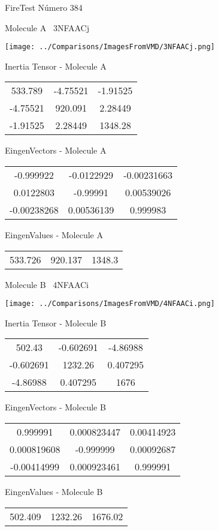\vtab[-3cm]
\begin{center}
{\large FireTest \tab Número 384}
\end{center}
\begin{multicols}{2}
\begin{center}

Molecule A \
3NFAACj

\texttt{[image: ../Comparisons/ImagesFromVMD/3NFAACj.png]}

Inertia Tensor - Molecule A \\
\begin{tabular}{|c c c|}
533.789	 & 	-4.75521	 & 	-1.91525	 \\
-4.75521	 & 	920.091	 & 	2.28449	 \\
-1.91525	 & 	2.28449	 & 	1348.28
\end{tabular}

\vtab
 EingenVectors - Molecule A     \\
\begin{tabular}{|c c c|}
-0.999922	 & 	-0.0122929	 & 	-0.00231663	 \\
0.0122803	 & 	-0.99991	 & 	0.00539026	 \\
-0.00238268	 & 	0.00536139	 & 	0.999983
\end{tabular}

\vtab
 EingenValues - Molecule A     \\
\begin{tabular}{|c c c|}
533.726	 & 	920.137	 & 	1348.3	 \\
\end{tabular}
\columnbreak

Molecule B \
4NFAACi

\texttt{[image: ../Comparisons/ImagesFromVMD/4NFAACi.png]}

Inertia Tensor - Molecule B \\
\begin{tabular}{|c c c|}
502.43	 & 	-0.602691	 & 	-4.86988	 \\
-0.602691	 & 	1232.26	 & 	0.407295	 \\
-4.86988	 & 	0.407295	 & 	1676
\end{tabular}

\vtab
 EingenVectors - Molecule B     \\
\begin{tabular}{|c c c|}
0.999991	 & 	0.000823447	 & 	0.00414923	 \\
0.000819608	 & 	-0.999999	 & 	0.00092687	 \\
-0.00414999	 & 	0.000923461	 & 	0.999991
\end{tabular}

\vtab
 EingenValues - Molecule B     \\
\begin{tabular}{|c c c|}
502.409	 & 	1232.26	 & 	1676.02	 \\
\end{tabular}

\end{center}
\end{multicols}

